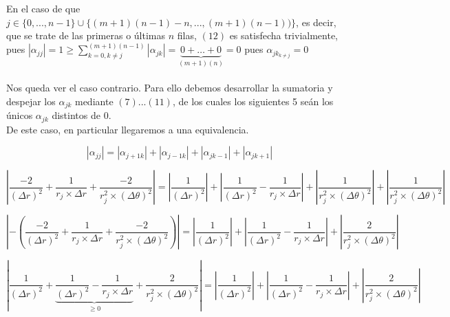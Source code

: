 En el caso de que $j \in \{0,...,n-1\} \cup \{(m+1)(n-1)-n,...,(m+1)(n-1))\}$, es decir, que se trate de las primeras o \'ultimas $n$ filas, $(12)$ es satisfecha trivialmente, pues  $\left | \alpha_{jj} \right | = 1 \geq \sum_{k=0,k \neq j}^{(m+1)(n-1)} \left | \alpha_{jk} \right | =  \underbrace{0+ \ldots +0}_{(m+1)(n)} = 0$ pues $\alpha_{jk_{k\neq j}}=0 $ 
\\
\\
Nos queda ver el caso contrario. Para ello debemos desarrollar la sumatoria y despejar los $\alpha_{jk}$ mediante $(7)...(11)$, de los cuales los siguientes 5 se\'an los \'unicos $\alpha_{jk}$ distintos de $0$.
\\
De este caso, en particular llegaremos a una equivalencia.

\begin{equation}
 \left | \alpha_{jj} \right | = \left | \alpha_{j+1k} \right | + \left | \alpha_{j-1k} \right | + \left | \alpha_{jk-1} \right | + \left | \alpha_{jk+1} \right |
\end{equation}

\begin{equation}
 \left | \frac{-2}{(\Delta r)^2} + \frac{1}{r_j \times \Delta r} + \frac{-2}{r_j^2 \times (\Delta \theta)^2} \right | = \left | \frac{1}{(\Delta r)^2} \right | + \left | \frac{1}{(\Delta r)^2} - \frac{1}{r_j \times \Delta r} \right | + \left | \frac{1}{r_j^2 \times (\Delta \theta)^2} \right | + \left | \frac{1}{r_j^2 \times (\Delta \theta)^2} \right |
\end{equation}

\begin{equation}
 \left | -\left ( \frac{-2}{(\Delta r)^2} + \frac{1}{r_j \times \Delta r} + \frac{-2}{r_j^2 \times (\Delta \theta)^2} \right ) \right | = \left | \frac{1}{(\Delta r)^2} \right | + \left | \frac{1}{(\Delta r)^2} - \frac{1}{r_j \times \Delta r} \right | + \left | \frac{2}{r_j^2 \times (\Delta \theta)^2} \right | 
\end{equation}

\begin{equation}
 \left | \frac{1}{(\Delta r)^2} + \underbrace{\frac{1}{(\Delta r)^2} - \frac{1}{r_j \times \Delta r}}_{ \geq 0} + \frac{2}{r_j^2 \times (\Delta \theta)^2} \right | = \left | \frac{1}{(\Delta r)^2} \right | + \left | \frac{1}{(\Delta r)^2} - \frac{1}{r_j \times \Delta r} \right | +  \left | \frac{2}{r_j^2 \times (\Delta \theta)^2} \right |
\end{equation}

